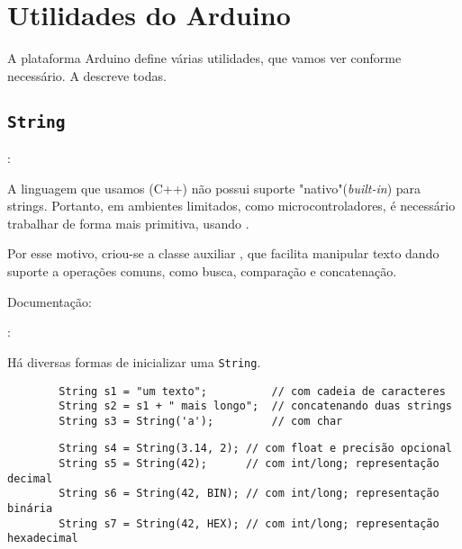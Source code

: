 \section{Utilidades do Arduino}


\begin{frame}{\insertsection}

	A plataforma Arduino define várias utilidades, que vamos ver conforme necessário. A  descreve todas.

\end{frame}


\subsection{\texttt{String}}


\begin{frame}[b]{\insertsection: \insertsubsection}

	A linguagem que usamos (C++) não possui suporte "nativo"\@ (\textit{built-in}) para strings. Portanto, em ambientes limitados, como microcontroladores, é necessário trabalhar de forma mais primitiva, usando .

	\medskip
	Por esse motivo, criou-se a classe auxiliar , que facilita manipular texto dando suporte a operações comuns, como busca, comparação e concatenação.

	\vfill
	Documentação: 

\end{frame}


\begin{frame}[fragile]{\insertsection: \insertsubsection}

	Há diversas formas de inicializar uma \texttt{String}.

	\begin{verbatim}
		String s1 = "um texto";          // com cadeia de caracteres
		String s2 = s1 + " mais longo";  // concatenando duas strings
		String s3 = String('a');         // com char
	\end{verbatim}

	\begin{verbatim}
		String s4 = String(3.14, 2); // com float e precisão opcional
		String s5 = String(42);      // com int/long; representação decimal
		String s6 = String(42, BIN); // com int/long; representação binária
		String s7 = String(42, HEX); // com int/long; representação hexadecimal
	\end{verbatim}

\end{frame}



